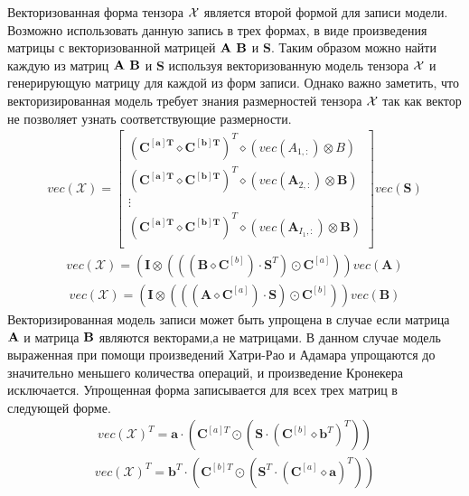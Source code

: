 Векторизованная форма тензора $\mathcal{X}$ является второй формой для записи модели. Возможно использовать данную запись в трех формах\cite{Book6}, в виде произведения матрицы с векторизованной матрицей $\mathbf{A}$ $\mathbf{B}$ и $\mathbf{S}$. Таким образом можно найти каждую из матриц $\mathbf{A}$ $\mathbf{B}$ и $\mathbf{S}$ используя векторизованную модель тензора $\mathcal{X}$ и генерирующую матрицу для каждой из форм записи. Однако важно заметить, что векторизированная модель требует знания размерностей тензора $\mathcal{X}$ так как вектор не позволяет узнать соответствующие размерности\cite{Book5}.
\begin{align}
vec(\mathcal{X})=\begin{bmatrix}
(\mathbf{C^{[a]T}} \diamond \mathbf{C^{[b]T}})^T \diamond (vec(A_{1,:})\otimes B)\\
(\mathbf{C^{[a]T}} \diamond \mathbf{C^{[b]T}})^T \diamond (vec(\mathbf{A}_{2,:})\otimes \mathbf{B})\\
\vdots \\
(\mathbf{C^{[a]T}} \diamond \mathbf{C^{[b]T}})^T \diamond (vec(\mathbf{A}_{I_1,:})\otimes \mathbf{B})\\
\end{bmatrix} vec(\mathbf{S})
\label{p_3}
\end{align}
\begin{align}
vec(\mathcal{X})=(\mathbf{I} \otimes(((\mathbf{B}\diamond \mathbf{C}^{[b]}) \cdot \mathbf{S}^T) \odot \mathbf{C}^{[a]}) )vec(\mathbf{A})
\label{p_4}
\end{align}
\begin{align}
vec(\mathcal{X})=(\mathbf{I} \otimes (((\mathbf{A}\diamond \mathbf{C}^{[a]}) \cdot \mathbf{S}) \odot \mathbf{C}^{[b]} ))vec(\mathbf{B})
\label{p_5}
\end{align}
Векторизированная модель записи может быть упрощена в случае если матрица $\mathbf{A}$ и матрица $\mathbf{B}$ являются векторами,а не матрицами. В данном случае модель выраженная при помощи произведений Хатри-Рао и Адамара упрощаются до значительно меньшего количества операций, и произведение Кронекера исключается.
Упрощенная форма записывается для всех трех матриц в следующей форме.
\begin{align}
vec(\mathcal{X})^T=\mathbf{a}\cdot (\mathbf{C}^{[a]T} \odot (\mathbf{S}\cdot (\mathbf{C}^{[b]}\diamond \mathbf{b}^T)^T))
\label{p_6}
\end{align}
\begin{align}
vec(\mathcal{X})^T=\mathbf{b}^T\cdot (\mathbf{C}^{[b]T} \odot (\mathbf{S}^T  \cdot (\mathbf{C}^{[a]}\diamond \mathbf{a})^T))
\label{p_7}
\end{align}
